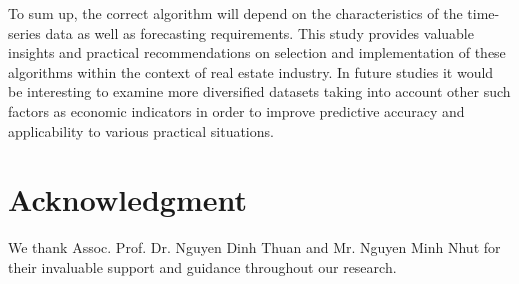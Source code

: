 \documentclass[conference]{IEEEtran}
\begin{document}
To sum up, the correct algorithm will depend on the characteristics of the time-series data as well as forecasting requirements. This study provides valuable insights and practical recommendations on selection and implementation of these algorithms within the context of real estate industry. In future studies it would be interesting to examine more diversified datasets taking into account other such factors as economic indicators in order to improve predictive accuracy and applicability to various practical situations.
\section*{Acknowledgment}

We thank Assoc. Prof. Dr. Nguyen Dinh Thuan and Mr. Nguyen Minh Nhut for their invaluable support and guidance throughout our research.
\end{document}

